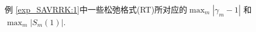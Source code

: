 \documentclass[aspectratio=169]{beamer}
\numberwithin{theorem}{section} %
\numberwithin{equation}{section}%
\numberwithin{figure}{section}%
\numberwithin{table}{section}%
\begin{document}
\begin{frame}%

\begin{figure}[H]
	\begin{center}
	\caption{例 \ref{exp_SAVRRK:1}中一些松弛格式(RT)所对应的$\max_m\left|\gamma_m-1\right|$ 和 $\max_m\left|S_m(1)\right|$.}
	\label{fig_SAVRRK:1}
	\end{center}
	\end{figure}
\end{frame}
\end{document}
